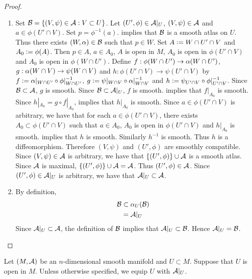 \documentclass{book}
\begin{document}
\begin{proof}\
	\begin{enumerate}
		\item Set $\mathcal{B} = \{(V, \psi) \in \mathcal{A}: V \subset U\}$. Let $(U', \phi) \in \mathcal{A}|_U$, $(V, \psi) \in \mathcal{A}$ and $a \in \phi(U' \cap V)$. Set $p = \phi^{-1}(a)$.  implies that $\mathcal{B}$ is a smooth atlas on $U$. Thus there exists $(W, \alpha) \in \mathcal{B}$ such that $p \in W$. Set $A \vcentcolon= W \cap U' \cap V$ and $A_0 \vcentcolon= \phi(A)$. Then $p \in A$, $a \in A_0$, $A$ is open in $M$, $A_0$ is open in $\phi(U' \cap V)$ and $A_0$ is open in $\phi(W \cap U')$. Define $f: \phi(W \cap U') \rightarrow \alpha(W \cap U')$, $g: \alpha(W \cap V) \rightarrow \psi(W \cap V)$ and $h: \phi(U' \cap V) \rightarrow \psi(U' \cap V)$ by $f \vcentcolon= \alpha|_{W \cap U'} \circ \phi|_{W \cap U'}^{-1}$, $g \vcentcolon= \psi|_{W \cap V} \circ \alpha|_{W \cap V}^{-1}$ and $h \vcentcolon= \psi_{U' \cap V} \circ \phi|_{U' \cap V}^{-1}$. Since $\mathcal{B} \subset \mathcal{A}$, $g$ is smooth. Since $\mathcal{B} \subset \mathcal{A}|_U$, $f$ is smooth.  implies that $f|_{A_0}$ is smooth. Since $h|_{A_0} = g \circ f|_{A_0}$,  implies that $h|_{A_0}$ is smooth. Since $a \in \phi(U' \cap V)$ is arbitrary, we have that for each $a \in \phi(U' \cap V)$, there exists $A_0 \subset \phi(U' \cap V)$ such that $a \in A_0$, $A_0$ is open in $\phi(U' \cap V)$ and $h|_{A_0}$ is smooth.  implies that $h$ is smooth. Similarly $h^{-1}$ is smooth. Thus $h$ is a diffeomorphism. Therefore $(V, \psi)$ and $(U', \phi)$ are smoothly compatible. Since $(V, \psi) \in \mathcal{A}$ is arbitrary, we have that $\{(U', \phi)\} \cup \mathcal{A}$ is a smooth atlas. Since $\mathcal{A}$ is maximal, $\{(U', \phi)\} \cup \mathcal{A} = \mathcal{A}$. Thus $(U', \phi) \in \mathcal{A}$. Since $(U', \phi) \in \mathcal{A}|_U$ is arbitrary, we have that $\mathcal{A}|_U \subset \mathcal{A}$. 
		\item By definition, 
		\begin{align*}
			\mathcal{B}
			& \subset \alpha_U(\mathcal{B}) \\
			& = \mathcal{A}|_U
		\end{align*}
		Since $\mathcal{A}|_U \subset \mathcal{A}$, the definition of $\mathcal{B}$ implies that $\mathcal{A}|_U \subset \mathcal{B}$. Hence $\mathcal{A}|_U = \mathcal{B}$.
	\end{enumerate}
\end{proof}


\begin{note} 
	Let $(M, \mathcal{A})$ be an $n$-dimensional smooth manifold and $U \subset M$. Suppose that $U$ is open in $M$. Unless otherwise specified, we equip $U$ with $\mathcal{A}|_U$.
\end{note}
\end{document}
